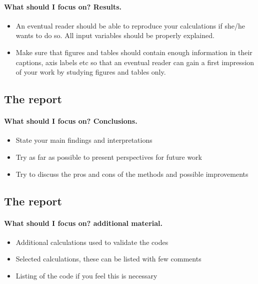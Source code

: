 \documentclass[%
twoside,                 %
final,                   %
10pt]{article}
\newenvironment{paragraphadmon}[1][]{\paragraph{#1}}{}
\begin{document}
{{{{{{{{{\begin{paragraphadmon}[What should I focus on? Results.]
\begin{itemize}
 \item An eventual reader should be able to reproduce your calculations if she/he wants to do so. All input variables should be properly explained.

 \item Make sure that figures and tables should contain enough information in their captions, axis labels etc so that an eventual reader can gain a first impression of your work by studying figures and tables only.
\end{itemize}

\noindent
\end{paragraphadmon}




\subsection{The report}

\begin{paragraphadmon}[What should I focus on? Conclusions.]
\begin{itemize}
 \item State your main findings and interpretations

 \item Try as far as possible to present perspectives for future work

 \item Try to discuss the pros and cons of the methods and possible improvements
\end{itemize}

\noindent
\end{paragraphadmon}



\subsection{The report}

\begin{paragraphadmon}[What should I focus on? additional material.]
\begin{itemize}
 \item Additional calculations used to validate the codes

 \item Selected calculations, these can be listed with  few comments

 \item Listing of the code if you feel this is necessary
\end{itemize}


\end{paragraphadmon}}}}}}}}}}
\end{document}
